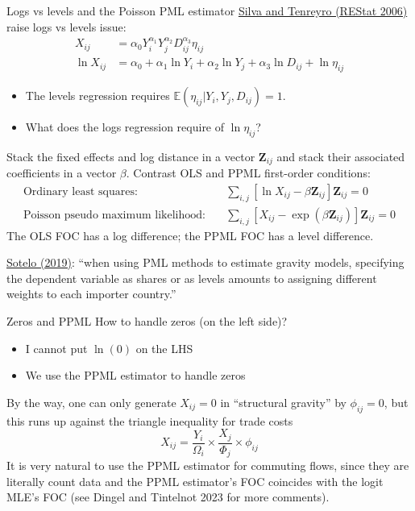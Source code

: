 \documentclass[10pt,notes=hide,aspectratio=169]{beamer}
\begin{document}
\begin{frame}{Logs vs levels and the Poisson PML estimator}
\href{https://personal.lse.ac.uk/tenreyro/LGW.html}{Silva and Tenreyro (REStat 2006)} raise logs vs levels issue:
\begin{align*}
X_{ij} &= \alpha_0 Y_i^{\alpha_1}  Y_j^{\alpha_2}  D_{ij}^{\alpha_3} \eta_{ij}
\\
\ln X_{ij} &= \alpha_0 +{\alpha_1} \ln  Y_i   +{\alpha_2}\ln  Y_j +{\alpha_3} \ln D_{ij} + \ln \eta_{ij}
\end{align*}
\vspace{-7mm}
\begin{itemize}
	\item The levels regression requires $\mathbb{E}\left(\eta_{ij}|Y_i,Y_j,D_{ij}\right)=1$.
	\item What does the logs regression require of $\ln \eta_{ij}$?
\end{itemize}
\smallskip \pause
Stack the fixed effects and log distance in a vector $\mathbf{Z}_{ij}$
and
stack their associated coefficients in a vector $\beta$.
Contrast OLS and PPML first-order conditions:
\begin{align*}
  \text{Ordinary least squares:} \quad
  &
  \sum_{i,j} \left[\ln X_{ij} - \beta \mathbf{Z}_{ij} \right] \mathbf{Z}_{ij}= 0
  \\
  \text{Poisson pseudo maximum likelihood:} \quad
  &
  \sum_{i,j} \left[X_{ij} - \exp\left(\beta \mathbf{Z}_{ij}\right)\right] \mathbf{Z}_{ij}= 0
\end{align*}
The OLS FOC has a log difference; the PPML FOC has a level difference.\\
{\small \href{http://www-personal.umich.edu/~ssotelo/research/Sotelo_MPMLE.pdf}{Sotelo (2019)}: ``when using PML methods to estimate gravity models, specifying the dependent variable as shares or as levels amounts to assigning different weights to each importer country.''\par}
\end{frame}
\begin{frame}{Zeros and PPML}
How to handle zeros (on the left side)?
\begin{itemize}
	\item I cannot put $\ln(0)$ on the LHS
	\item We use the PPML estimator to handle zeros
\end{itemize}
\medskip
By the way, one can only generate $X_{ij}=0$ in ``structural gravity'' by $\phi_{ij} = 0$, but this runs up against the triangle inequality for trade costs
\begin{equation*}
X_{ij} = {\frac{Y_i}{\Omega_i}} \times {\frac{X_j}{\Phi_j}} \times \phi_{ij}
\end{equation*}
\medskip
It is very natural to use the PPML estimator for commuting flows,
since they are literally count data and the PPML estimator's FOC coincides with the logit MLE's FOC
(see Dingel and Tintelnot 2023 for more comments).
\end{frame}
\end{document}
